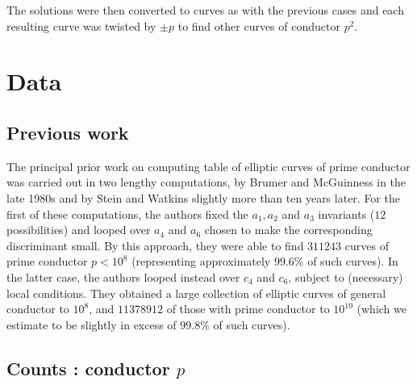 The solutions were then converted to curves as with the previous cases and each resulting 
curve was twisted by $\pm p$ to find other curves of conductor $p^2$. 

\section{Data} \label{data}

\subsection{Previous work}
The principal prior work on computing table of elliptic curves of prime conductor was carried out in two lengthy computations, by Brumer and McGuinness \cite{BrMc} in the late 1980s and by Stein and Watkins \cite{StWa} slightly more than ten years later. 
For the first of these computations, the authors  fixed the $a_1, a_2$ and $a_3$ invariants ($12$ possibilities) and looped over $a_4$ and $a_6$ chosen to make the corresponding discriminant small.
By this approach, they were able to find $311243$ curves of prime conductor $p < 10^8$ (representing approximately $99.6 \%$ of such curves). In the latter case, the authors looped instead over $c_4$ and $c_6$, subject to (necessary) local conditions. They obtained a large collection of elliptic curves of general conductor to $10^8$, and $11378912$ of those with prime conductor to $10^{10}$ (which we estimate to be slightly in excess of $99.8 \%$ of such curves).

\subsection{Counts : conductor $p$}

